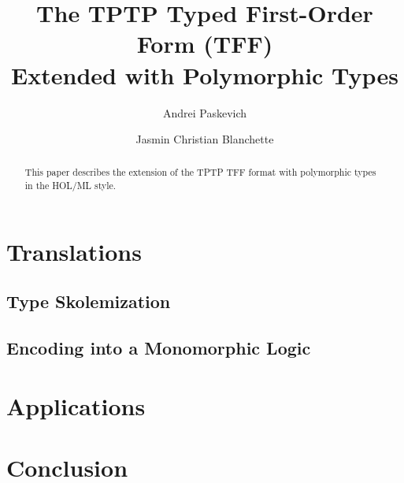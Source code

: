 \documentclass[draft,a4paper]{llncs}
\begin{document}
\title{
The TPTP Typed First-Order Form (TFF) \\ Extended with Polymorphic Types}

\author{
Andrei Paskevich \and Jasmin Christian Blanchette
}


\maketitle

\begin{abstract}
This paper describes the extension of the TPTP TFF format with polymorphic
types in the HOL/ML style.
\end{abstract}



\section{Translations}
  \subsection{Type Skolemization}
  \subsection{Encoding into a Monomorphic Logic} %
\section{Applications}
\section{Conclusion}

%
%
\end{document}
